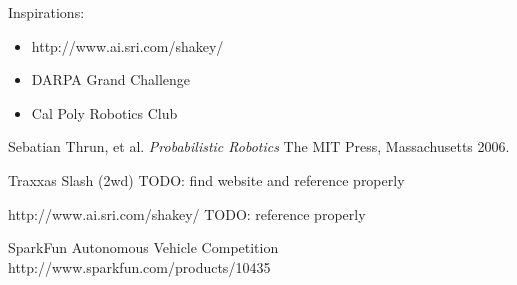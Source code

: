 Inspirations:
\begin{itemize}
\item http://www.ai.sri.com/shakey/
\item DARPA Grand Challenge
\item Cal Poly Robotics Club
\end{itemize}

\begin{thebibliography}{9}

   Sebatian Thrun, et al.
   \emph{Probabilistic Robotics}
   The MIT Press, Massachusetts
   2006.

   Traxxas Slash (2wd)
   TODO: find website and reference properly

   http://www.ai.sri.com/shakey/
   TODO: reference properly

   SparkFun Autonomous Vehicle Competition
   http://www.sparkfun.com/products/10435

\end{thebibliography}
